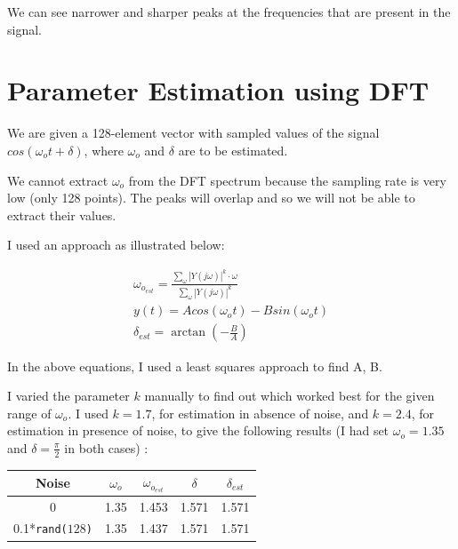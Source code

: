 \documentclass[11pt, a4paper, twoside]{article}
\begin{document}
    We can see narrower and sharper peaks at the frequencies that are present in the signal.

\section{Parameter Estimation using DFT}
    We are given a 128-element vector with sampled values of the signal $cos(\omega_ot+\delta)$, where $\omega_o$ and $\delta$ are to be estimated.
    
    We cannot extract $\omega_o$ from the DFT spectrum because the sampling rate is very low (only 128 points). The peaks will overlap and so we will not be able to extract their values.
    
    I used an approach as illustrated below:
    
    \begin{gather*}
        \omega_{o_{est}} = \frac{\sum_{\omega}|Y(j\omega)|^k\cdot \omega}{\sum_{\omega}|Y(j\omega)|^k}\\
        y(t) = Acos(\omega_ot) - Bsin(\omega_ot)\\
        \delta_{est} = \arctan(-\frac{B}{A})
    \end{gather*}
    
    In the above equations, I used a least squares approach to find A, B.
    
    I varied the parameter $k$ manually to find out which worked best for the given range of $\omega_o$. I used $k = 1.7$, for estimation in absence of noise, and $k = 2.4$, for estimation in presence of noise, to give the following results (I had set $\omega_o = 1.35$ and $\delta=\frac{\pi}{2}$ in both cases) :
    \vspace{3mm}
    \begin{table}[htbp]
        \centering
        \begin{tabular}{c|c|c|c|c}
            Noise & $\omega_o$ & $\omega_{o_{est}}$ & $\delta$ & $\delta_{est}$\\
            \hline
             0 & 1.35 & 1.453 & 1.571 & 1.571\\
             0.1*\texttt{rand($128$)} & 1.35 & 1.437 & 1.571 & 1.571\\
        \end{tabular}
        \label{tab:results}
    \end{table}
\end{document}
